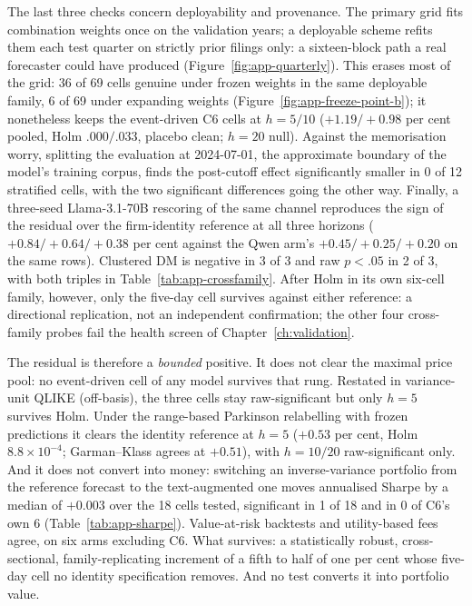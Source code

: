 The last three checks concern deployability and provenance. The primary grid fits combination weights once on the validation years; a deployable scheme refits them each test quarter on strictly prior filings only: a sixteen-block path a real forecaster could have produced (Figure~\ref{fig:app-quarterly}). This erases most of the grid: 36 of 69 cells genuine under frozen weights in the same deployable family, 6 of 69 under expanding weights (Figure~\ref{fig:app-freeze-point-b}); it nonetheless keeps the event-driven C6 cells at $h{=}5/10$ ($+1.19/+0.98$ per cent pooled, Holm $.000/.033$, placebo clean; $h{=}20$ null). %
Against the memorisation worry, splitting the evaluation at 2024-07-01, the approximate boundary of the model's training corpus, finds the post-cutoff effect significantly smaller in 0 of 12 stratified cells, with the two significant differences going the other way. %
Finally, a three-seed Llama-3.1-70B rescoring of the same channel \cite{llama3_2024} reproduces the sign of the residual over the firm-identity reference at all three horizons ($+0.84/+0.64/+0.38$ per cent against the Qwen arm's $+0.45/+0.25/+0.20$ on the same rows). Clustered DM is negative in 3 of 3 and raw $p<.05$ in 2 of 3, with both triples in Table~\ref{tab:app-crossfamily}. After Holm in its own six-cell family, however, only the five-day cell survives against either reference: a directional replication, not an independent confirmation; the other four cross-family probes fail the health screen of Chapter~\ref{ch:validation}. %

The residual is therefore a \emph{bounded} positive. It does not clear the maximal price pool: no event-driven cell of any model survives that rung. %
Restated in variance-unit QLIKE (off-basis), the three cells stay raw-significant but only $h{=}5$ survives Holm. %
Under the range-based Parkinson relabelling \cite{parkinson1980extreme} with frozen predictions it clears the identity reference at $h{=}5$ ($+0.53$ per cent, Holm $8.8\times10^{-4}$; Garman--Klass \cite{garmanklass1980estimation} agrees at $+0.51$), with $h{=}10/20$ raw-significant only. %
And it does not convert into money: switching an inverse-variance portfolio from the reference forecast to the text-augmented one moves annualised Sharpe by a median of $+0.003$ over the 18 cells tested, significant in 1 of 18 and in 0 of C6's own 6 (Table~\ref{tab:app-sharpe}). %
Value-at-risk backtests and utility-based fees agree, on six arms excluding C6. %
What survives: a statistically robust, cross-sectional, family-replicating increment of a fifth to half of one per cent whose five-day cell no identity specification removes. And no test converts it into portfolio value.

